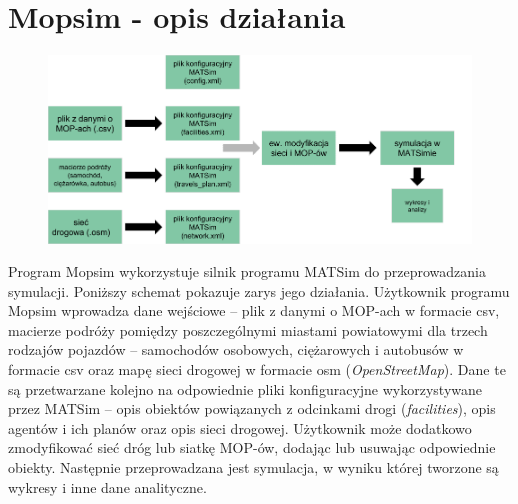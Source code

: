 \section{Mopsim - opis działania}
    \begin{figure}[h]
        \includegraphics[width=\textwidth]{images/mopsim/mopsim-workflow2.png}
    \end{figure}
Program Mopsim wykorzystuje silnik programu MATSim do przeprowadzania
symulacji. Poniższy schemat pokazuje zarys jego działania. Użytkownik programu
Mopsim wprowadza dane wejściowe -- plik z danymi o MOP-ach w formacie csv,
macierze podróży pomiędzy poszczególnymi miastami powiatowymi dla trzech
rodzajów pojazdów -- samochodów osobowych, ciężarowych i autobusów w formacie
csv oraz mapę sieci drogowej w formacie \acrshort{osm}
(\textit{OpenStreetMap}\cite{osm}). Dane te są przetwarzane kolejno na odpowiednie pliki konfiguracyjne wykorzystywane przez MATSim -- opis obiektów powiązanych z odcinkami drogi (\textit{facilities}), opis agentów i ich planów oraz opis sieci drogowej. Użytkownik może dodatkowo zmodyfikować sieć dróg lub siatkę MOP-ów, dodając lub usuwając odpowiednie obiekty. Następnie przeprowadzana jest symulacja, w wyniku której tworzone są wykresy i inne dane analityczne.

